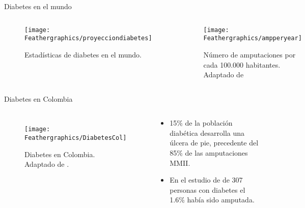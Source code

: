 \documentclass[10pt]{beamer}
\begin{document}
\begin{frame}{Diabetes en el mundo}
\begin{columns}[t]


\column{55 mm}
\begin{block}{}
{\footnotesize{}}

\begin{figure}
\begin{centering}
\texttt{[image: Feathergraphics/proyecciondiabetes]}
\par\end{centering}
\caption{Estadísticas de diabetes en el mundo. \cite{ref1}}
\end{figure}
\end{block}

\column{75 mm}

\begin{block}{}
\begin{figure}
\begin{centering}
\texttt{[image: Feathergraphics/ampperyear]}
\par\end{centering}
\caption{Número de amputaciones por cada 100.000 habitantes. Adaptado de \cite{KrogerKnut2015} }
\end{figure}

\end{block}
\end{columns}

\end{frame}

\begin{frame}{Diabetes en Colombia}

\begin{columns}[t]


\column{60 mm}

\begin{figure}
\begin{centering}
\texttt{[image: Feathergraphics/DiabetesCol]}
\par\end{centering}
\caption{{\scriptsize{}Diabetes en Colombia. Adaptado de \cite{Ramirez2014}. }}

\end{figure}


\column{40 mm}
\begin{exampleblock}{}
{\footnotesize{}}

\begin{itemize}
\item {\footnotesize{}15\% de la población diabética desarrolla una úlcera
de pie, precedente del 85\% de las amputaciones MMII. \cite{Ramirez2014}}{\footnotesize \par}
\item {\footnotesize{}En el estudio de \cite{Pinilla2011} de 307 personas
con diabetes el 1.6\% había sido amputada.}{\footnotesize \par}
\end{itemize}
\end{exampleblock}
\end{columns}

\end{frame}
\end{document}
